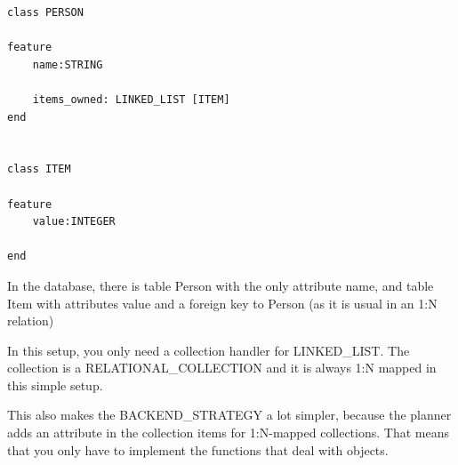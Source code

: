 \begin{lstlisting}[language=OOSC2Eiffel, captionpos=b, caption={Application classes}, label={lst:example_application}]
class PERSON

feature
	name:STRING

	items_owned: LINKED_LIST [ITEM]
end


class ITEM

feature
	value:INTEGER

end
\end{lstlisting}

In the database, there is table Person with the only attribute name, and table Item with attributes value and a foreign key to Person (as it is usual in an 1:N relation)

In this setup, you only need a collection handler for LINKED\_LIST.
The collection is a RELATIONAL\_COLLECTION and it is always 1:N mapped in this simple setup.

This also makes the BACKEND\_STRATEGY a lot simpler, because the planner adds an attribute in the collection items for 1:N-mapped collections.
That means that you only have to implement the functions that deal with objects.









